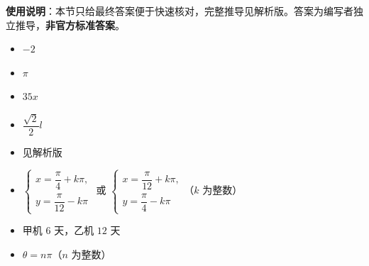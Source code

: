 
\begin{gknotice}
\textbf{使用说明}：本节只给最终答案便于快速核对，完整推导见解析版。答案为编写者独立推导，\textbf{非官方标准答案}。
\end{gknotice}

\begin{itemize}[leftmargin=2.6em]
  \item[\textbf{1.}] $-2$
  \item[\textbf{2.}] $\pi$
  \item[\textbf{3.}] $35x$
  \item[\textbf{4.}] $\dfrac{\sqrt2}{2}l$
\end{itemize}

\begin{itemize}[leftmargin=2.6em]
  \item[\textbf{5.}] 见解析版
  \item[\textbf{6.}] $\begin{cases}x=\dfrac\pi4+k\pi,\\ y=\dfrac\pi{12}-k\pi\end{cases}$ 或 $\begin{cases}x=\dfrac\pi{12}+k\pi,\\ y=\dfrac\pi4-k\pi\end{cases}$（$k$ 为整数）
  \item[\textbf{7.}] 甲机 $6$ 天，乙机 $12$ 天
  \item[\textbf{8.}] $\theta=n\pi$（$n$ 为整数）
\end{itemize}
